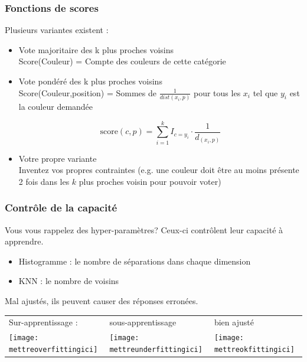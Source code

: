 \documentclass[french]{beamer}
\begin{document}
\begin{frame}
\frametitle{Fonctions de scores}
Plusieurs variantes existent :
\begin{itemize}
\item{Vote majoritaire des k plus proches voisins}\\
Score(Couleur) = Compte des couleurs de cette catégorie

\item{Vote pondéré des k plus proches voisins}\\
Score(Couleur,position) = Sommes de $\frac{1}{dist(x_i,p)}$ pour tous les $x_i$ tel que $y_i$ est la couleur demandée

$$\text{score}(c, p) = \sum_{i=1}^k I_{c=y_i} \cdot \frac{1}{d_(x_i,p)}$$

\item{Votre propre variante}\\
Inventez vos propres contraintes (e.g. une couleur doit être au moins présente 2 fois dans les $k$ plus proches voisin pour pouvoir voter)

\end{itemize}

\end{frame}

\begin{frame}
\frametitle{Contrôle de la capacité}
Vous vous rappelez des hyper-paramètres? Ceux-ci contrôlent leur capacité à apprendre. 

\begin{itemize}
\item Histogramme : le nombre de séparations dans chaque dimension
\item KNN : le nombre de voisins
\end{itemize}

Mal ajustés, ils peuvent causer des réponses erronées.

\begin{tabular}{lll}
Sur-apprentissage : & sous-apprentissage & bien ajusté\\
\texttt{[image: mettreoverfittingici]}
&\texttt{[image: mettreunderfittingici]}
&\texttt{[image: mettreokfittingici]}\\
\end{tabular}
\end{frame}
\end{document}
